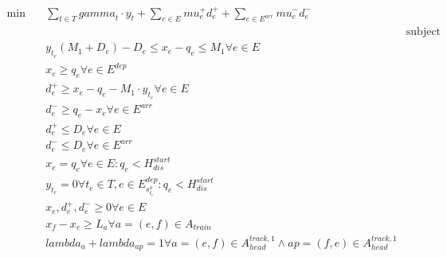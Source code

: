 \begin{align}
  \min\quad & \sum_{t \in T} \mathit{gamma}_{t} \cdot y_{t} + \sum_{e \in E} \mathit{mu}_{e}^{+} d_{e}^{+} + \underset{e \in E^{\mathit{arr}}}{\sum} \mathit{mu}_{e}^{-} d_{e}^{-} \tag{eq\_0001} \\
  &  & \text{subject to} \\ & y_{t_{e}} \left(M_{1} + D_{e}\right) - D_{e} \leq x_{e} - q_{e} \leq M_{1} \forall e \in E  \tag{eq\_0002} \\
  & x_{e} \geq q_{e} \forall e \in E^{\mathit{dep}} \tag{eq\_0003} \\
  & d_{e}^{+} \geq x_{e} - q_{e} - M_{1} \cdot y_{t_{e}} \forall e \in E \tag{eq\_0004} \\
  & d_{e}^{-} \geq q_{e} - x_{e} \forall e \in E^{\mathit{arr}} \tag{eq\_0005} \\
  & d_{e}^{+} \leq D_{e} \forall e \in E \tag{eq\_0006} \\
  & d_{e}^{-} \leq D_{e} \forall e \in E^{\mathit{arr}} \tag{eq\_0007} \\
  & x_{e} = q_{e} \forall e \in E : q_{e} < H_{\mathit{dis}}^{\mathit{start}} \tag{eq\_0008} \\
  & y_{t_{e}} = 0 \forall t_{e} \in T , e \in E_{s_{t_{e}}^{o}}^{\mathit{dep}} : q_{e} < H_{\mathit{dis}}^{\mathit{start}} \tag{eq\_0009} \\
  & x_{e} , d_{e}^{+} , d_{e}^{-} \geq 0 \forall e \in E \tag{eq\_0011} \\
  & x_{f} - x_{e} \geq L_{a} \forall a = \left(e , f\right) \in A_{\mathit{train}} \tag{eq\_0012} \\
  & \mathit{lambda}_{a} + \mathit{lambda}_{ap} = 1 \forall a = \left(e , f\right) \in A_{\mathit{head}}^{\mathit{track} , 1} \land ap = \left(f , e\right) \in A_{\mathit{head}}^{\mathit{track} , 1} \tag{eq\_0014} \\

\end{align}
